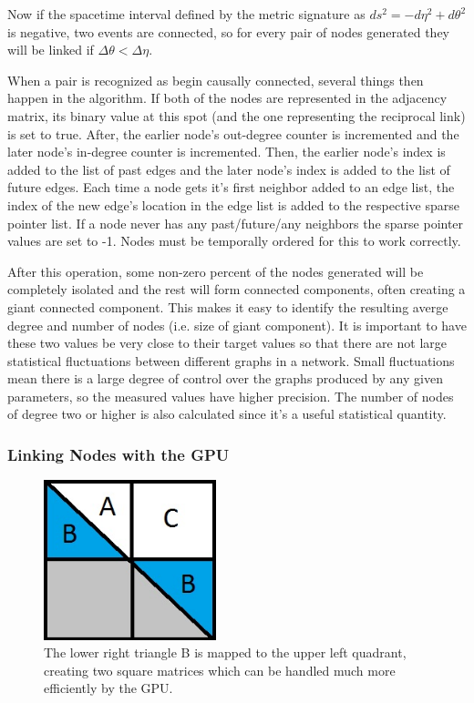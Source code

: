 \documentclass[preprint,notitlepage,amsmath,amssymb,floatfix]{revtex4-1}
\begin{document}
\noindent Now if the spacetime interval defined by the metric signature as $ds^2 = -d\eta^2 + d\theta^2$ is negative, two events are connected, so for every pair of nodes generated they will be linked if $\Delta\theta < \Delta\eta$.  \par
When a pair is recognized as begin causally connected, several things then happen in the algorithm.
If both of the nodes are represented in the adjacency matrix, its binary value at this spot (and the one representing the reciprocal link) is set to true.
After, the earlier node's out-degree counter is incremented and the later node's in-degree counter is incremented.
Then, the earlier node's index is added to the list of past edges and the later node's index is added to the list of future edges.
Each time a node gets it's first neighbor added to an edge list, the index of the new edge's location in the edge list is added to the respective sparse pointer list.
If a node never has any past/future/any neighbors the sparse pointer values are set to -1.
Nodes must be temporally ordered for this to work correctly. \par
After this operation, some non-zero percent of the nodes generated will be completely isolated and the rest will form connected components, often creating a giant connected component.
This makes it easy to identify the resulting averge degree and number of nodes (i.e. size of giant component).  
It is important to have these two values be very close to their target values so that there are not large statistical fluctuations between different graphs in a network.
Small fluctuations mean there is a large degree of control over the graphs produced by any given parameters, so the measured values have higher precision.
The number of nodes of degree two or higher is also calculated since it's a useful statistical quantity.
\subsubsection{Linking Nodes with the GPU}

\begin{figure}
\includegraphics[width=5cm]{figures/Matrix_Map.jpg}
\caption{The lower right triangle B is mapped to the upper left quadrant, creating two square matrices which can be handled much more efficiently by the GPU.}
\label{fig:matrix_map}
\centering
\end{figure}
\end{document}
